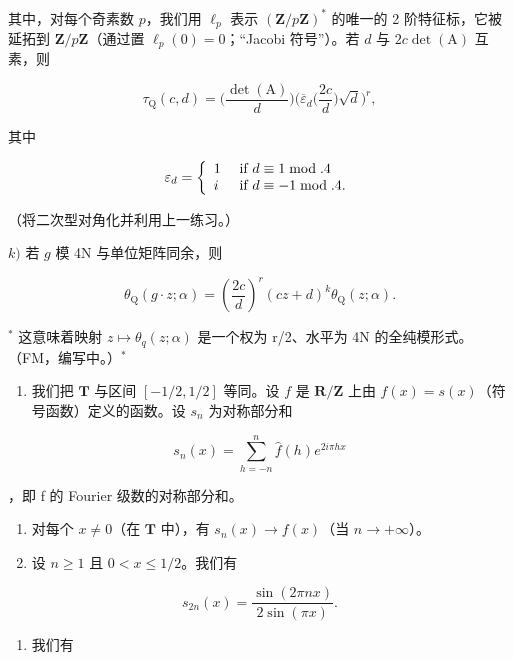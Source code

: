 其中，对每个奇素数 \(p\)，我们用 \(\ell_p\) 表示 \((\mathbf{Z}/p\mathbf{Z})^*\) 的唯一的 2 阶特征标，它被延拓到 \(\mathbf{Z}/p\mathbf{Z}\)（通过置 \(\ell_p(0) = 0\)；“Jacobi 符号”）。若 \(d\) 与 \(2c\det(\mathrm{A})\) 互素，则

\[
\tau_ {\mathrm{Q}} (c, d) = \Big (\frac {\det (\mathrm{A})}{d} \Big) \Big (\overline {{\varepsilon}} _ {d} \Big (\frac {2 c}{d} \Big) \sqrt {d} \Big) ^ {r},
\]

其中

\[
\varepsilon_ {d} = \left\{ \begin{array}{l l} 1 & \text { if } d \equiv 1 \bmod . 4 \\ i & \text { if } d \equiv - 1 \bmod . 4. \end{array} \right.
\]

（将二次型对角化并利用上一练习。）

\(k)\) 若 \(g\) 模 4N 与单位矩阵同余，则

\[
\theta_ {\mathrm{Q}} (g \cdot z; \alpha) = \left(\frac {2 c}{d}\right) ^ {r} (c z + d) ^ {k} \theta_ {\mathrm{Q}} (z; \alpha).
\]

\(^{*}\) 这意味着映射 \(z \mapsto \theta_{q}(z; \alpha)\) 是一个权为 r/2、水平为 4N 的全纯模形式。（FM，编写中。）\(^{*}\)

\begin{enumerate}
\def\labelenumi{\arabic{enumi})}
\setcounter{enumi}{61}
\tightlist
\item
  我们把 \(\mathbf{T}\) 与区间 \([-1/2, 1/2]\) 等同。设 \(f\) 是 \(\mathbf{R}/\mathbf{Z}\) 上由 \(f(x) = s(x)\)（符号函数）定义的函数。设 \(s_n\) 为对称部分和
\end{enumerate}

\[
s _ {n} (x) = \sum_ {h = - n} ^ {n} \widehat {f} (h) e ^ {2 i \pi h x}
\]

，即 f 的 Fourier 级数的对称部分和。

\begin{enumerate}
\def\labelenumi{\alph{enumi})}
\item
  对每个 \(x \neq 0\)（在 \(\mathbf{T}\) 中），有 \(s_n(x) \to f(x)\)（当 \(n \to +\infty\)）。
\item
  设 \(n \geqslant 1\) 且 \(0 < x \leqslant 1/2\)。我们有
\end{enumerate}

\[
s _ {2 n} (x) = \frac {\sin (2 \pi n x)}{2 \sin (\pi x)}.
\]

\begin{enumerate}
\def\labelenumi{\alph{enumi})}
\setcounter{enumi}{2}
\tightlist
\item
  我们有
\end{enumerate}

